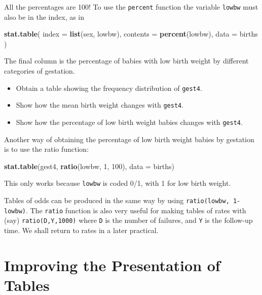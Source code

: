 \documentclass[
]{book}
\newenvironment{Shaded}{\begin{snugshade}}{\end{snugshade}}
\newcommand{\AttributeTok}[1]{\textcolor[rgb]{0.13,0.29,0.53}{#1}}
\newcommand{\DecValTok}[1]{\textcolor[rgb]{0.00,0.00,0.81}{#1}}
\newcommand{\FunctionTok}[1]{\textcolor[rgb]{0.13,0.29,0.53}{\textbf{#1}}}
\newcommand{\NormalTok}[1]{#1}
\providecommand{\tightlist}{%
  \setlength{\itemsep}{0pt}\setlength{\parskip}{0pt}}
\begin{document}
All the percentages are 100! To use the \texttt{percent} function the variable \texttt{lowbw} must also be in the index, as in

\begin{Shaded}
\begin{Highlighting}[]
\FunctionTok{stat.table}\NormalTok{(}
  \AttributeTok{index =} \FunctionTok{list}\NormalTok{(sex, lowbw), }
  \AttributeTok{contents =} \FunctionTok{percent}\NormalTok{(lowbw), }
  \AttributeTok{data =}\NormalTok{ births}
\NormalTok{)}
\end{Highlighting}
\end{Shaded}

The final column is the percentage of babies with low birth weight by different categories of gestation.

\begin{itemize}
\tightlist
\item
  Obtain a table showing the frequency distribution of \texttt{gest4}.
\item
  Show how the mean birth weight changes with \texttt{gest4}.
\item
  Show how the percentage of low birth weight babies changes with \texttt{gest4}.
\end{itemize}

Another way of obtaining the percentage of low birth weight babies by
gestation is to use the ratio function:

\begin{Shaded}
\begin{Highlighting}[]
\FunctionTok{stat.table}\NormalTok{(gest4, }\FunctionTok{ratio}\NormalTok{(lowbw, }\DecValTok{1}\NormalTok{, }\DecValTok{100}\NormalTok{), }\AttributeTok{data =}\NormalTok{ births)}
\end{Highlighting}
\end{Shaded}

This only works because \texttt{lowbw} is coded 0/1, with 1 for low birth
weight.

Tables of odds can be produced in the same way by using
\texttt{ratio(lowbw,\ 1-lowbw)}. The \texttt{ratio} function is also very useful
for making tables of rates with (say) \texttt{ratio(D,Y,1000)} where
\texttt{D} is the number of failures, and \texttt{Y} is the follow-up time. We
shall return to rates in a later practical.

\section{Improving the Presentation of Tables}\label{improving-the-presentation-of-tables}
\end{document}
